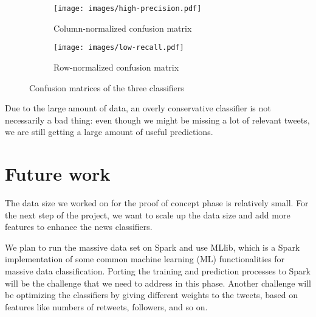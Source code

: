 \documentclass{llncs}
\begin{document}
\begin{figure}[H]
    \centering
    \begin{subfigure}[b]{0.48\textwidth}
        \texttt{[image: images/high-precision.pdf]}
        \caption{Column-normalized confusion matrix}
        \label{fig:column-confusion-matrix}
    \end{subfigure}
    \begin{subfigure}[b]{0.48\textwidth}
        \texttt{[image: images/low-recall.pdf]}
        \caption{Row-normalized confusion matrix}
        \label{fig:row-confusion-matrix}
    \end{subfigure}
    \caption{Confusion matrices of the three classifiers}
    \label{fig:confusion-matrix}
 \end{figure}
 
Due to the large amount of data, an overly conservative classifier is not necessarily a bad thing: even though we might be missing a lot of relevant tweets, we are still getting a large amount of useful predictions. 

\section{Future work}
The data size we worked on for the proof of concept phase is relatively small. For the next step of the project, we want to scale up the data size and add more features to enhance the news classifiers. 

We plan to run the massive data set on Spark and use MLlib, which is a Spark implementation of some common machine learning (ML) functionalities for massive data classification. Porting the training and prediction processes to Spark will be the challenge that we need to address in this phase. Another challenge will be optimizing the classifiers by giving different weights to the tweets, based on features like numbers of retweets, followers, and so on.



\end{document}
